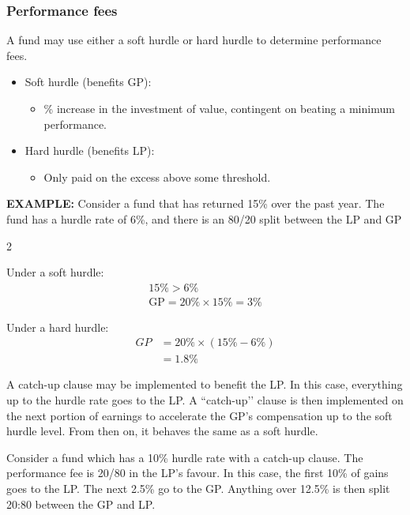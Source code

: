 \documentclass[../notes_compiled.tex]{subfiles}
\begin{document}
\subsubsection{Performance fees}
\begin{itemize}
\item A fund may use either a soft hurdle or hard hurdle to determine performance fees.
\begin{itemize}
\item Soft hurdle (benefits GP):
\begin{itemize}
\item \% increase in the investment of value, contingent on beating a minimum performance.
\end{itemize}
\item Hard hurdle (benefits LP):
\begin{itemize}
\item Only paid on the excess above some threshold.
\end{itemize}
\end{itemize}
{\color{RedViolet}
\item[] \textbf{EXAMPLE:} Consider a fund that has returned 15\% over the past year. The fund has a hurdle rate of 6\%, and there is an 80/20 split between the LP and GP
}
\begin{itemize}
{\color{RoyalBlue}
\begin{multicols}{2}
\item Under a soft hurdle:
\begin{gather*}
15\%>6\% \\
\text{GP}=20\% \times 15\% = 3\%
\end{gather*}
\item Under a hard hurdle:
\begin{align*}
GP&=20\%\times(15\%-6\%)\\
&=1.8\%
\end{align*}
\end{multicols}
}
\end{itemize}
\item A catch-up clause may be implemented to benefit the LP. In this case, everything up to the hurdle rate goes to the LP. A ``catch-up’’ clause is then implemented on the next portion of earnings to accelerate the GP’s compensation up to the soft hurdle level. From then on, it behaves the same as a soft hurdle.
{\color{RedViolet}
\item Consider a fund which has a 10\% hurdle rate with a catch-up clause. The performance fee is 20/80 in the LP’s favour. In this case, the first 10\% of gains goes to the LP. The next 2.5\% go to the GP. Anything over 12.5\% is then split 20:80 between the GP and LP.
}
\end{itemize}
\end{document}
